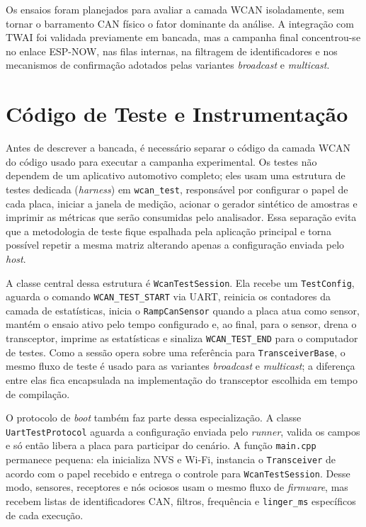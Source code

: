 Os ensaios foram planejados para avaliar a camada WCAN isoladamente, sem tornar o barramento CAN físico o fator dominante da análise. A integração com TWAI foi validada previamente em bancada, mas a campanha final concentrou-se no enlace ESP-NOW, nas filas internas, na filtragem de identificadores e nos mecanismos de confirmação adotados pelas variantes \emph{broadcast} e \emph{multicast}.


\section{Código de Teste e Instrumentação}

Antes de descrever a bancada, é necessário separar o código da camada WCAN do código usado para executar a campanha experimental. Os testes não dependem de um aplicativo automotivo completo; eles usam uma estrutura de testes dedicada (\emph{harness}) em \texttt{wcan\_test}, responsável por configurar o papel de cada placa, iniciar a janela de medição, acionar o gerador sintético de amostras e imprimir as métricas que serão consumidas pelo analisador. Essa separação evita que a metodologia de teste fique espalhada pela aplicação principal e torna possível repetir a mesma matriz alterando apenas a configuração enviada pelo \emph{host}.

A classe central dessa estrutura é \texttt{WcanTestSession}. Ela recebe um \texttt{TestConfig}, aguarda o comando \texttt{WCAN\_TEST\_START} via UART, reinicia os contadores da camada de estatísticas, inicia o \texttt{RampCanSensor} quando a placa atua como sensor, mantém o ensaio ativo pelo tempo configurado e, ao final, para o sensor, drena o transceptor, imprime as estatísticas e sinaliza \texttt{WCAN\_TEST\_END} para o computador de testes. Como a sessão opera sobre uma referência para \texttt{TransceiverBase}, o mesmo fluxo de teste é usado para as variantes \emph{broadcast} e \emph{multicast}; a diferença entre elas fica encapsulada na implementação do transceptor escolhida em tempo de compilação.

O protocolo de \emph{boot} também faz parte dessa especialização. A classe \texttt{UartTestProtocol} aguarda a configuração enviada pelo \emph{runner}, valida os campos e só então libera a placa para participar do cenário. A função \texttt{main.cpp} permanece pequena: ela inicializa NVS e Wi-Fi, instancia o \texttt{Transceiver} de acordo com o papel recebido e entrega o controle para \texttt{WcanTestSession}. Desse modo, sensores, receptores e nós ociosos usam o mesmo fluxo de \emph{firmware}, mas recebem listas de identificadores CAN, filtros, frequência e \texttt{linger\_ms} específicos de cada execução.

